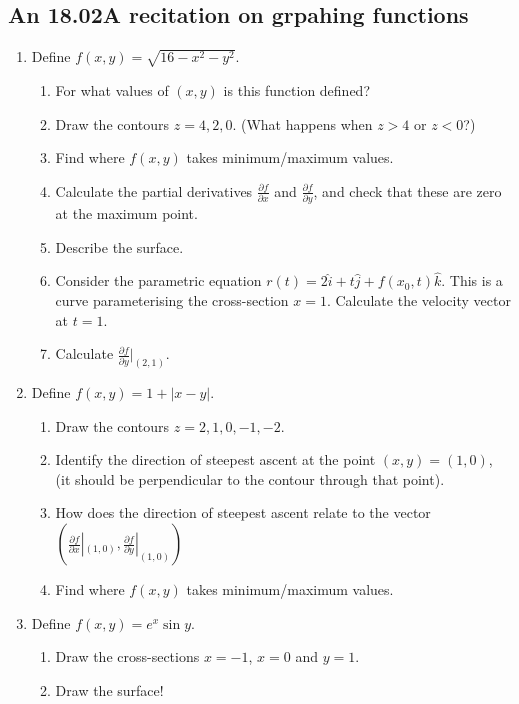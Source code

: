 \documentclass[11pt]{article}
\begin{document}
\subsection*{An 18.02A recitation on grpahing functions}

\begin{enumerate}\squishlist
\item Define $f(x,y)=\sqrt{16-x^2-y^2}$.
\begin{enumerate}
\item For what values of $(x,y)$ is this function defined?
\item Draw the contours $z=4,2,0$. (What happens when $z>4$ or $z<0$?)
\item Find where $f(x,y)$ takes minimum/maximum values.
\item Calculate the partial derivatives $\frac{\partial f}{\partial x}$ and $\frac{\partial f}{\partial y}$, and check that these are zero at the maximum point.
\item Describe the surface.
\item Consider the parametric equation $r(t)=2\hat i + t\hat j + f(x_0,t)\hat k$. This is a curve parameterising the cross-section $x=1$. Calculate the velocity vector at $t=1$. 
\item Calculate $\frac{\partial f}{\partial y}\bigr|_{(2,1)}$.
\end{enumerate}
\item Define  $f(x,y)=1+|x-y|$.
\begin{enumerate}
\item Draw the contours $z=2,1,0,-1,-2$.
\item Identify the direction of steepest ascent at the point $(x,y)=(1,0)$, (it should be perpendicular to the contour through that point).
\item How does the direction of steepest ascent relate to the vector $\left(\frac{\partial f}{\partial x}|_{(1,0)},\frac{\partial f}{\partial y}|_{(1,0)}\right)$
\item Find where $f(x,y)$ takes minimum/maximum values.
\end{enumerate}
\item Define  $f(x,y)=e^{x}\sin y$.
\begin{enumerate}
\item Draw the cross-sections $x=-1$, $x=0$ and $y=1$.
\item Draw the surface!

\end{enumerate}
\end{enumerate}
\end{document}
